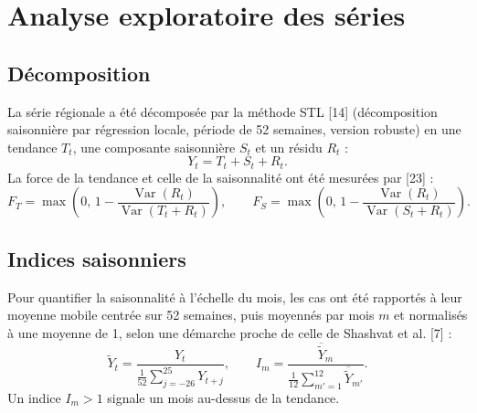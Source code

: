 \documentclass[11pt]{article}
\begin{document}
\section{Analyse exploratoire des séries}
\subsection{Décomposition}
La série régionale a été décomposée par la méthode STL [14] (décomposition saisonnière par régression locale, période de 52 semaines, version robuste) en une tendance $T_t$, une composante saisonnière $S_t$ et un résidu $R_t$ :
\begin{equation}
Y_t=T_t+S_t+R_t .
\label{eq:stl}
\end{equation}
La force de la tendance et celle de la saisonnalité ont été mesurées par [23] :
\begin{equation}
F_T=\max\!\left(0,\,1-\frac{\operatorname{Var}(R_t)}{\operatorname{Var}(T_t+R_t)}\right),\qquad F_S=\max\!\left(0,\,1-\frac{\operatorname{Var}(R_t)}{\operatorname{Var}(S_t+R_t)}\right).
\label{eq:force}
\end{equation}

\subsection{Indices saisonniers}
Pour quantifier la saisonnalité à l'échelle du mois, les cas ont été rapportés à leur moyenne mobile centrée sur 52 semaines, puis moyennés par mois $m$ et normalisés à une moyenne de 1, selon une démarche proche de celle de Shashvat et al. [7] :
\begin{equation}
\tilde{Y}_t=\frac{Y_t}{\frac{1}{52}\sum_{j=-26}^{25}Y_{t+j}},\qquad I_m=\frac{\overline{\tilde{Y}}_{m}}{\frac{1}{12}\sum_{m'=1}^{12}\overline{\tilde{Y}}_{m'}} .
\label{eq:indice}
\end{equation}
Un indice $I_m>1$ signale un mois au-dessus de la tendance.
\end{document}
